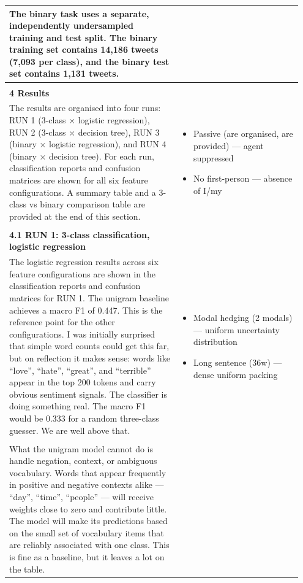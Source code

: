 \documentclass[11pt]{article}
\begin{document}
\begin{longtable}{|p{0.55\linewidth}|p{0.40\linewidth}|}
\hline
The binary task uses a separate, independently undersampled training and test split. The binary training set contains 14,186 tweets (7,093 per class), and the binary test set contains 1,131 tweets. &  \\[2pt]
\hline
\rule{0pt}{3.5cm} & \\
\hline
\textbf{4 Results}\\[4pt]
The results are organised into four runs: RUN 1 (3-class × logistic regression), RUN 2 (3-class × decision tree), RUN 3 (binary × logistic regression), and RUN 4 (binary × decision tree). For each run, classification reports and confusion matrices are shown for all six feature configurations. A summary table and a 3-class vs binary comparison table are provided at the end of this section. & \begin{itemize}[leftmargin=1em,itemsep=1pt,topsep=1pt,parsep=0pt]
  \item Passive (are organised, are provided) --- agent suppressed
  \item No first-person --- absence of I/my
\end{itemize} \\[2pt]
\hline
\rule{0pt}{3.5cm} & \\
\hline
\textbf{4.1 RUN 1: 3-class classification, logistic regression}\\[4pt]
The logistic regression results across six feature configurations are shown in the classification reports and confusion matrices for RUN 1. The unigram baseline achieves a macro F1 of 0.447. This is the reference point for the other configurations. I was initially surprised that simple word counts could get this far, but on reflection it makes sense: words like ``love'', ``hate'', ``great'', and ``terrible'' appear in the top 200 tokens and carry obvious sentiment signals. The classifier is doing something real. The macro F1 would be 0.333 for a random three-class guesser. We are well above that. & \begin{itemize}[leftmargin=1em,itemsep=1pt,topsep=1pt,parsep=0pt]
  \item Modal hedging (2 modals) --- uniform uncertainty distribution
  \item Long sentence (36w) --- dense uniform packing
\end{itemize} \\[2pt]
\hline
\rule{0pt}{3.5cm} & \\
\hline
What the unigram model cannot do is handle negation, context, or ambiguous vocabulary. Words that appear frequently in positive and negative contexts alike --- ``day'', ``time'', ``people'' --- will receive weights close to zero and contribute little. The model will make its predictions based on the small set of vocabulary items that are reliably associated with one class. This is fine as a baseline, but it leaves a lot on the table. & \begin{itemize}[leftmargin=1em,itemsep=1pt,topsep=1pt,parsep=0pt]

\end{itemize}
\end{longtable}
\end{document}
